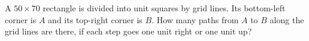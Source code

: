 A $50\times70$ rectangle is divided into unit squares by grid lines. Its bottom-left corner is $A$ and its top-right corner is $B$. How many paths from $A$ to $B$ along the grid lines are there, if each step goes one unit right or one unit up?
